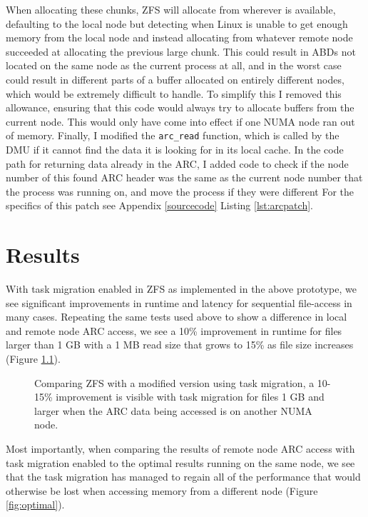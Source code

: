 When allocating these chunks, ZFS will allocate from wherever is available, defaulting to the local node
but detecting when Linux is unable to get enough memory from the local node and instead allocating
from whatever remote node succeeded at allocating the previous large chunk.
This could result in ABDs not located on the same node as the current process at all,
and in the worst case could result in different parts of a buffer allocated on entirely different nodes,
which would be extremely difficult to handle.
To simplify this I removed this allowance, ensuring that this code would always try to allocate buffers
from the current node.
This would only have come into effect if one NUMA node ran out of memory.
Finally, I modified the \texttt{arc\_read} function, which is called by the DMU if it cannot find the data it is looking
for in its local cache.
In the code path for returning data already in the ARC,
I added code to check if the node number of this found ARC header was the same as the current node number that the process
was running on, and move the process if they were different 
For the specifics of this patch see Appendix \ref{sourcecode} Listing \ref{lst:arcpatch}.

\chapter{Results}
With task migration enabled in ZFS as implemented in the above prototype, we see significant improvements in runtime and latency
for sequential file-access in many cases.
Repeating the same tests used above to show a difference in local and remote node ARC access, we see a 10\%
improvement in runtime for files larger than 1 GB with a 1 MB read size that grows to 15\% as file size increases 
(Figure \ref{fig:smallresults}).

\begin{figure}[H]
    \centering
    \resizebox{0.45\linewidth}{!}{}
    \resizebox{0.40\linewidth}{!}{}
    \captionsetup{width=0.85\linewidth}
    \caption{Comparing ZFS with a modified version using task migration, a 10-15\% improvement is visible with task migration for files 1 GB and larger 
        when the ARC data being accessed is on another NUMA node.}
    \label{fig:smallresults}
\end{figure}

Most importantly, when comparing the results of remote node ARC access with task migration enabled to the optimal results
running on the same node, we see that the task migration has managed to regain all of the performance that would otherwise be lost when accessing memory from a different node (Figure \ref{fig:optimal}).

